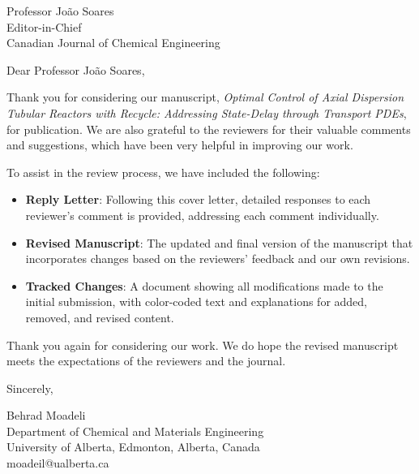 \documentclass[12pt]{letter}
\begin{document}
\date{November 27, 2024}

\begin{letter}{Professor João Soares \\
Editor-in-Chief \\
Canadian Journal of Chemical Engineering}

\opening{Dear Professor João Soares,}

Thank you for considering our manuscript, \textit{Optimal Control of Axial Dispersion Tubular Reactors with Recycle: Addressing State-Delay through Transport PDEs}, for publication. We are also grateful to the reviewers for their valuable comments and suggestions, which have been very helpful in improving our work.

To assist in the review process, we have included the following:
\begin{itemize}
    \item \textbf{Reply Letter}: Following this cover letter, detailed responses to each reviewer’s comment is provided, addressing each comment individually.
    \item \textbf{Revised Manuscript}: The updated and final version of the manuscript that incorporates changes based on the reviewers' feedback and our own revisions.
    \item \textbf{Tracked Changes}: A document showing all modifications made to the initial submission, with color-coded text and explanations for added, removed, and revised content.
\end{itemize}

Thank you again for considering our work. We do hope the revised manuscript meets the expectations of the reviewers and the journal.

\closing{Sincerely,}

\vspace{-4em} %

Behrad Moadeli \\
Department of Chemical and Materials Engineering \\
University of Alberta, Edmonton, Alberta, Canada \\
moadeil@ualberta.ca

\end{letter}
\end{document}
